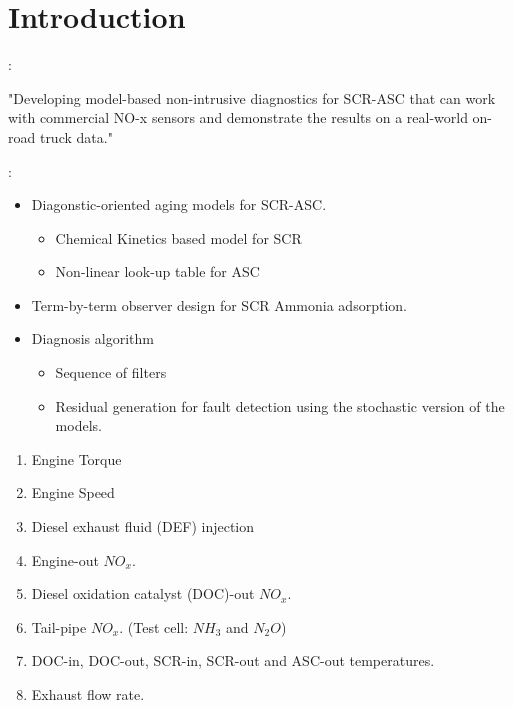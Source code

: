 \section{Introduction}

:

"Developing model-based non-intrusive diagnostics for SCR-ASC that can work with commercial NO-x sensors and demonstrate the results on a real-world on-road truck data."

\bigskip

:
\begin{itemize}
    \item Diagonstic-oriented aging models for SCR-ASC.
    \begin{itemize}
        \item Chemical Kinetics based model for SCR
        \item Non-linear look-up table for ASC
    \end{itemize}
    \item Term-by-term observer design for SCR Ammonia adsorption.
    \item Diagnosis algorithm
    \begin{itemize}
        \item Sequence of filters
        \item Residual generation for fault detection using the stochastic version of the models.
    \end{itemize}
\end{itemize}

\begin{enumerate}
    \item Engine Torque
    \item Engine Speed
    \item Diesel exhaust fluid (DEF) injection
    \item Engine-out $NO_x$.
    \item Diesel oxidation catalyst (DOC)-out $NO_x$.
    \item Tail-pipe $NO_x$. (Test cell: $NH_3$ and $N_2O$)
    \item DOC-in, DOC-out, SCR-in, SCR-out and ASC-out temperatures.
    \item Exhaust flow rate.
\end{enumerate}

